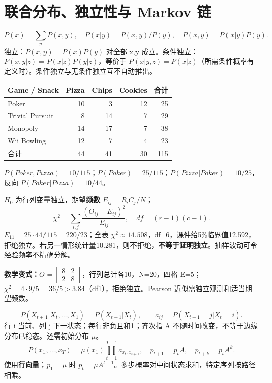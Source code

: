 \section{联合分布、独立性与 Markov 链}\label{sec:markov}
\[
P(x)=\sum_yP(x,y),\quad P(x|y)=P(x,y)/P(y),\quad P(x,y)=P(x|y)P(y).
\]
独立：$P(x,y)=P(x)P(y)$ 对全部 x,y 成立。条件独立：$P(x,y|z)=P(x|z)P(y|z)$，等价于 $P(x|y,z)=P(x|z)$（所需条件概率有定义时）。条件独立与无条件独立互不自动推出。

\begin{center}\begin{tabular}{l|rrr|r}\toprule
Game / Snack&Pizza&Chips&Cookies&合计\\\midrule
Poker&10&3&12&25\\Trivial Pursuit&8&14&7&29\\Monopoly&14&17&7&38\\Wii Bowling&12&7&4&23\\\midrule
合计&44&41&30&115\\\bottomrule\end{tabular}\end{center}
$P(Poker,Pizza)=10/115$；$P(Poker)=25/115$；$P(Pizza|Poker)=10/25$，反向 $P(Poker|Pizza)=10/44$。

$H_0$ 为行列变量独立，期望\textbf{频数} $E_{ij}=R_iC_j/N$；
\[
\chi^2=\sum_{i,j}\frac{(O_{ij}-E_{ij})^2}{E_{ij}},\quad df=(r-1)(c-1).
\]
$E_{11}=25\cdot44/115=220/23$；全表 $\chi^2\approx14.508$，df=6，课件给5\%临界值12.592，拒绝独立。若另一情形统计量10.281，则不拒绝，\textbf{不等于证明独立}。抽样波动可令经验频率不精确分解。

\textbf{教学变式：}$O=\left[\begin{smallmatrix}8&2\\2&8\end{smallmatrix}\right]$，行列总计各10，N=20，四格 E=5；$\chi^2=4\cdot9/5=36/5>3.84$（df1），拒绝独立。Pearson 近似需独立观测和适当期望频数。

\[
P(X_{t+1}|X_t,\ldots,X_1)=P(X_{t+1}|X_t),\qquad a_{ij}=P(X_{t+1}=j|X_t=i).
\]
行 i 当前、列 j 下一状态；每行非负且和1；齐次指 A 不随时间改变，不等于边缘分布已稳态。还需初始分布 $\mu$。
\[
P(x_1,\ldots,x_T)=\mu(x_1)\prod_{t=1}^{T-1}a_{x_t,x_{t+1}},\quad
p_{t+1}=p_tA,\quad p_{t+k}=p_tA^k.
\]
使用\textbf{行向量}；$p_1=\mu$ 时 $p_t=\mu A^{t-1}$。多步概率对中间状态求和，特定序列按路径相乘。

